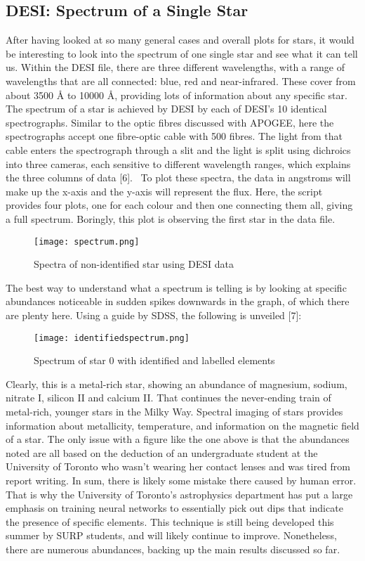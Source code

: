 \documentclass{article}
\begin{document}
\subsection*{DESI: Spectrum of a Single Star}
\indent After having looked at so many general cases and overall plots for stars, it would be interesting to look into the spectrum of one single star and see what it can tell us. Within the DESI file, there are three different wavelengths, with a range of wavelengths that are all connected: blue, red and near-infrared. These cover from about 3500 Å to 10000 Å, providing lots of information about any specific star. The spectrum of a star is achieved by DESI by each of DESI’s 10 identical spectrographs. Similar to the optic fibres discussed with APOGEE, here the spectrographs accept one fibre-optic cable with 500 fibres. The light from that cable enters the spectrograph through a slit and the light is split using dichroics into three cameras, each sensitive to different wavelength ranges, which explains the three columns of data [6].  To plot these spectra, the data in angstroms will make up the x-axis and the y-axis will represent the flux. Here, the script provides four plots, one for each colour and then one connecting them all, giving a full spectrum. Boringly, this plot is observing the first star in the data file.\\
\begin{figure}[H]
    \centering
    \texttt{[image: spectrum.png]}
    \caption{Spectra of non-identified star using DESI data}
    \label{fig:5}
\end{figure}
\indent The best way to understand what a spectrum is telling is by looking at specific abundances noticeable in sudden spikes downwards in the graph, of which there are plenty here. Using a guide by SDSS, the following is unveiled [7]:
\begin{figure}[H]
    \centering
    \texttt{[image: identifiedspectrum.png]}
    \caption{Spectrum of star 0 with identified and labelled elements}
    \label{fig:enter-label}
\end{figure}
\indent Clearly, this is a metal-rich star, showing an abundance of magnesium, sodium, nitrate I, silicon II and calcium II. That continues the never-ending train of metal-rich, younger stars in the Milky Way. Spectral imaging of stars provides information about metallicity, temperature, and information on the magnetic field of a star. The only issue with a figure like the one above is that the abundances noted are all based on the deduction of an undergraduate student at the University of Toronto who wasn’t wearing her contact lenses and was tired from report writing. In sum, there is likely some mistake there caused by human error. That is why the University of Toronto's astrophysics department has put a large emphasis on training neural networks to essentially pick out dips that indicate the presence of specific elements. This technique is still being developed this summer by SURP students, and will likely continue to improve. Nonetheless,  there are numerous abundances, backing up the main results discussed so far.\\
\end{document}
